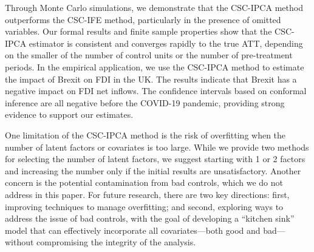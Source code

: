 \documentclass[12pt]{article}
\begin{document}
Through Monte Carlo simulations, we demonstrate that the CSC-IPCA method outperforms the CSC-IFE method, particularly in the presence of omitted variables. Our formal results and finite sample properties show that the CSC-IPCA estimator is consistent and converges rapidly to the true ATT, depending on the smaller of the number of control units or the number of pre-treatment periods. In the empirical application, we use the CSC-IPCA method to estimate the impact of Brexit on FDI in the UK. The results indicate that Brexit has a negative impact on FDI net inflows. The confidence intervals based on conformal inference are all negative before the COVID-19 pandemic, providing strong evidence to support our estimates.

One limitation of the CSC-IPCA method is the risk of overfitting when the number of latent factors or covariates is too large. While we provide two methods for selecting the number of latent factors, we suggest starting with 1 or 2 factors and increasing the number only if the initial results are unsatisfactory. Another concern is the potential contamination from bad controls, which we do not address in this paper. For future research, there are two key directions: first, improving techniques to manage overfitting; and second, exploring ways to address the issue of bad controls, with the goal of developing a ``kitchen sink'' model that can effectively incorporate all covariates—both good and bad—without compromising the integrity of the analysis.

\clearpage
\begingroup
{}


\endgroup

\clearpage
\appendix
{}
\renewcommand{\theequation}{\thesection.\arabic{equation}}
\setcounter{equation}{0}
\renewcommand{\theassumption}{\thesection.\arabic{assumption}}
\setcounter{assumption}{1}
\renewcommand{\thefigure}{\thesection.\arabic{figure}}
\setcounter{figure}{0}
\renewcommand{\thetable}{\thesection.\arabic{table}}
\setcounter{figure}{0}
\end{document}
